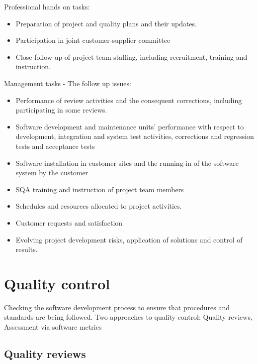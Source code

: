 \documentclass{article}
\begin{document}
\begin{flushleft}
Professional hands on tasks:
\begin{itemize}
  \item Preparation of project and quality plans and their updates.
  \item Participation in joint customer-supplier committee
  \item Close follow up of project team staffing, including recruitment, training and instruction.
\end{itemize}
Management tasks - The follow up issues:
\begin{itemize}
  \item Performance of review activities and the consequent corrections, including participating in some reviews.
  \item Software development and maintenance units’ performance with respect to development, integration and system test activities, corrections and regression tests and acceptance tests
  \item Software installation in customer sites and the running-in of the software system by the customer
  \item SQA training and instruction of project team members 
  \item Schedules and resources allocated to project activities. 
  \item Customer requests and satisfaction
  \item Evolving project development risks, application of solutions and control of results. 
\end{itemize}
\end{flushleft}

\section{Quality control}

\begin{flushleft}
Checking the software development process to ensure that procedures and standards are being followed. Two approaches to quality control: Quality reviews, Assessment via software metrics
\end{flushleft}

\subsection{Quality reviews}
\end{document}
